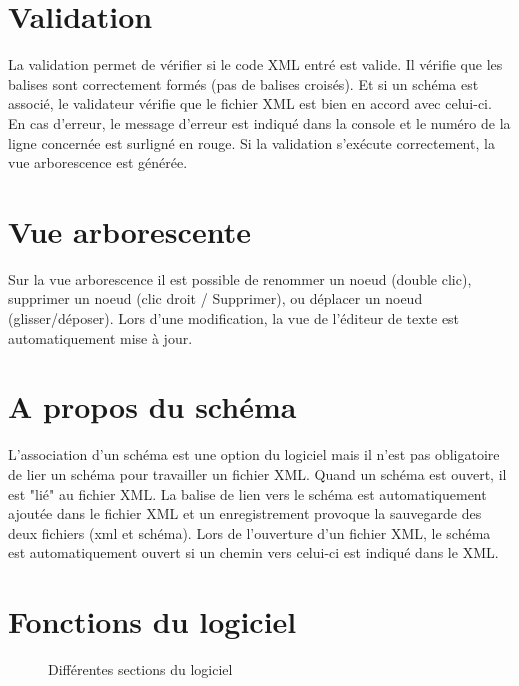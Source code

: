\section{Validation}
La validation permet de vérifier si le code XML entré est valide.
Il vérifie que les balises sont correctement formés (pas de balises croisés).
Et si un schéma est associé, le validateur vérifie que le fichier XML est bien en accord avec celui-ci.
En cas d'erreur, le message d'erreur est indiqué dans la console et le numéro de la ligne concernée est surligné en rouge.
Si la validation s'exécute correctement, la vue arborescence est générée.

\section{Vue arborescente}
Sur la vue arborescence il est possible de renommer un noeud (double clic), supprimer un noeud (clic droit / Supprimer), ou déplacer un noeud (glisser/déposer).
Lors d'une modification, la vue de l'éditeur de texte est automatiquement mise à jour.

\section{A propos du schéma}
L'association d'un schéma est une option du logiciel mais il n'est pas obligatoire de lier un schéma pour travailler un fichier XML.
Quand un schéma est ouvert, il est "lié" au fichier XML. La balise de lien vers le schéma est automatiquement ajoutée dans le fichier XML
et un enregistrement provoque la sauvegarde des deux fichiers (xml et schéma).
Lors de l'ouverture d'un fichier XML, le schéma est automatiquement ouvert si un chemin vers celui-ci est indiqué dans le XML.

\section{Fonctions du logiciel}


\begin{figure}[h!]
\noindent{}
\caption{Différentes sections du logiciel}
\end{figure}
